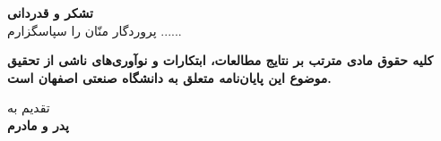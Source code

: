 \thispagestyle{empty}
\vspace*{3cm}

{\large
	\textbf{تشکر و قدردانی}\\

	
پروردگار منّان را سپاسگزارم ......

}
\restoregeometry
\pagebreak
{}
\thispagestyle{empty}

\begin{spacing}{3}
	\leavevmode
	\vfill
	\parbox{8 cm}{
		
		\textbf{\Large کلیه حقوق مادی مترتب بر نتایج مطالعات، ابتکارات و نوآوری‌های ناشی از تحقیق موضوع این پایان‌نامه متعلق به دانشگاه صنعتی اصفهان است.}
		
	}
	\vfill
\end{spacing}
\restoregeometry
\pagebreak

\thispagestyle{empty}


\vspace*{\fill}
\begin{center}
{\LARGE تقدیم به}\\
\vspace{1cm}
\textbf{{\Huge پدر و مادرم}}
\end{center}
\vspace*{\fill}

\bgroup\vspace*{\fill}
\renewcommand{\\}{\vspace{-.5em}\newline\relax}
\newcommand{\تب}[1][.5]{\hspace*{#1cm}}
\noindent
\vspace*{\fill}\egroup
\pagebreak


